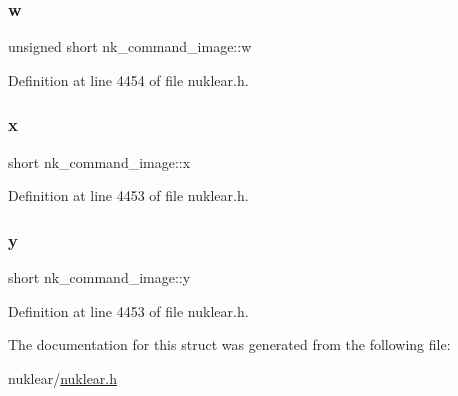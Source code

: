 \subsubsection{\texorpdfstring{w}{w}}
{\footnotesize\ttfamily unsigned short nk\+\_\+command\+\_\+image\+::w}



Definition at line 4454 of file nuklear.\+h.

\mbox{\label{structnk__command__image_aaaf990c35a61ed7fe29a292d85eb636c}} 
\subsubsection{\texorpdfstring{x}{x}}
{\footnotesize\ttfamily short nk\+\_\+command\+\_\+image\+::x}



Definition at line 4453 of file nuklear.\+h.

\mbox{\label{structnk__command__image_a918d37c9a97ec8ef3541fc611da83264}} 
\subsubsection{\texorpdfstring{y}{y}}
{\footnotesize\ttfamily short nk\+\_\+command\+\_\+image\+::y}



Definition at line 4453 of file nuklear.\+h.



The documentation for this struct was generated from the following file\+:\begin{DoxyCompactItemize}
\item 
nuklear/\mbox{\hyperlink{nuklear_8h}{nuklear.\+h}}\end{DoxyCompactItemize}
